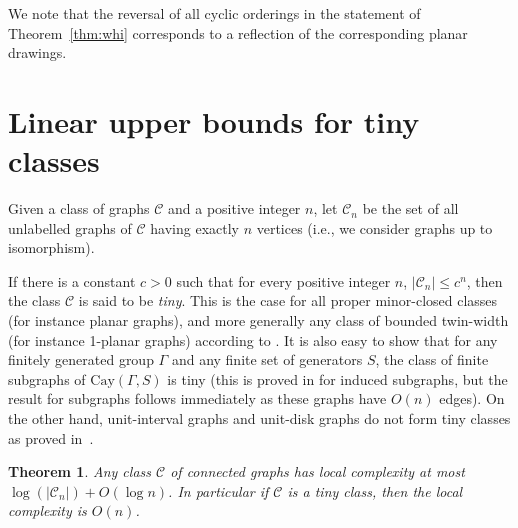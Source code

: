 \documentclass[a4paper,reqno, 12pt]{amsart}
\newtheorem{theorem}{Theorem}[section]
\begin{document}
We note that the reversal of all cyclic orderings in the statement of
Theorem~\ref{thm:whi} corresponds to a
reflection of the corresponding planar drawings. 

\section{Linear upper bounds for tiny classes}\label{sec:linear}


Given a class of graphs $\mathcal{C}$ and a positive integer $n$, let
$\mathcal{C}_n$ be the set of all unlabelled graphs of $\mathcal{C}$
having exactly $n$ vertices (i.e., we consider graphs up to
isomorphism).

\medskip

If there is a constant $c>0$ such that for every positive integer $n$,
$|\mathcal{C}_n|\le c^n$, then the class $\mathcal{C}$ is said to be
\emph{tiny}. This is the case for all
proper minor-closed classes (for instance planar graphs), and more
generally any class of bounded twin-width (for instance 1-planar graphs) according to \cite{bonnet2021twin}. It is also easy to show
that  for any finitely generated group $\Gamma$ and any finite
set of generators $S$, the class of finite  subgraphs of
$\mathrm{Cay}(\Gamma, S)$ is tiny (this is proved in \cite{bonnet2021twin} for induced subgraphs, but the result for subgraphs follows
immediately as these graphs have $O(n)$ edges).
On the other hand, unit-interval graphs and unit-disk graphs do not form tiny classes as proved in~\cite{MCDIARMID2014413}.

\begin{theorem}
  Any class $\mathcal{C}$ of connected graphs has local complexity at most
$\log(|\mathcal{C}_n|)+O(\log n)$. In particular if  $\mathcal{C}$ is
a tiny class, then the local complexity is $O(n)$.
\end{theorem}
\end{document}
